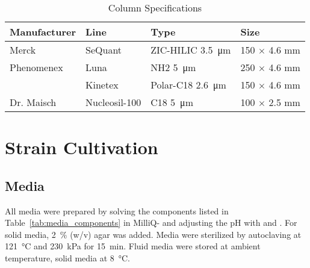 	\begin{table}[htbp]
		\caption{Column Specifications}
		\label{tab:column_parameters}
		\centering
			\begin{tabularx}{\textwidth}{XXXX}
			\toprule
			\textbf{Manufacturer} 	& \textbf{Line} 						& \textbf{Type} 					& \textbf{Size} 	\\
			\midrule
			Merck 					& SeQuant\textsuperscript{\textregistered} 		& \mbox{ZIC\textsuperscript{\textregistered}-HILIC} \SI{3.5}{\micro\meter}					& 150 $\times$ 4.6 mm 	\\
			Phenomenex 				& Luna\textsuperscript{\textregistered} 			& NH2 \SI{5}{\micro\meter}		& 250 $\times$ 4.6 mm 	\\
									& Kinetex\textsuperscript{\textregistered} 		& Polar-C18	\SI{2.6}{\micro\meter}						& 150 $\times$ 4.6 mm 	\\
			Dr. Maisch 				& Nucleosil-100 & C18 \SI{5}{\micro\meter} 							& 100 $\times$ 2.5 mm 	\\
			\bottomrule
			\end{tabularx}
		\end{table}
\clearpage

\section{Strain Cultivation} %
\label{sec:strain_cultivation}

	\subsection{Media} %
	\label{sub:media}

	All media were prepared by solving the components listed in Table~\ref{tab:media_components} in MilliQ- and adjusting the pH with  and . For solid media, 2~\% (w/v) agar was added. Media were sterilized by autoclaving at \SI{121}{\celsius} and \SI{230}{\kilo\pascal} for \SI{15}{\minute}. Fluid media were stored at ambient temperature, solid media at \SI{8}{\celsius}.

